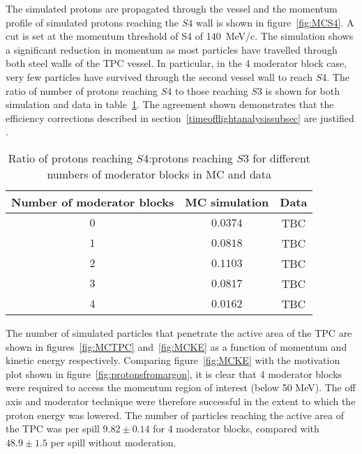 The simulated protons are propagated through the vessel and the momentum profile of simulated protons reaching the $\mathit{S4}$ wall is shown in figure~\ref{fig:MCS4}. A cut is set at the momentum threshold of S4 of 140~MeV/c. The simulation shows a significant reduction in momentum as most particles have travelled through both steel walls of the TPC vessel. In particular, in the 4 moderator block case, very few particles have survived through the second vessel wall to reach $\mathit{S4}$. The ratio of number of protons reaching $\mathit{S4}$ to those reaching $\mathit{S3}$ is shown for both simulation and data in table~\ref{tab:ratios}. The agreement shown demonstrates that the efficiency corrections described in section~\ref{timeofflightanalysissubsec} are justified .
\begin{table}
  \centering
  \begin{tabular}{|c|c|c|}
    \hline
    Number of moderator blocks & MC simulation & Data \\
    \hline
    $0$ & $0.0374$ & TBC \\
    $1$ & $0.0818$ & TBC \\
    $2$ & $0.1103$ & TBC \\
    $3$ & $0.0817$ & TBC \\
    $4$ & $0.0162$ & TBC \\
    \hline
  \end{tabular}
  \caption{Ratio of protons reaching $\mathit{S4}$:protons reaching $\mathit{S3}$ for different numbers of moderator blocks in MC and data}
  \label{tab:ratios}
\end{table}

The number of simulated particles that penetrate the active area of the TPC are shown in figures~\ref{fig:MCTPC} and~\ref{fig:MCKE} as a function of momentum and kinetic energy respectively. Comparing figure~\ref{fig:MCKE} with the motivation plot shown in figure~\ref{fig:protonsfromargon}, it is clear that 4 moderator blocks were required to access the momentum region of interest (below 50 MeV). The off axis and moderator technique were therefore successful in the extent to which the proton energy was lowered.
The number of particles reaching the active area of the TPC was  per spill $9.82 \pm  0.14$ for 4 moderator blocks, compared with $48.9 \pm 1.5$ per spill without moderation.

